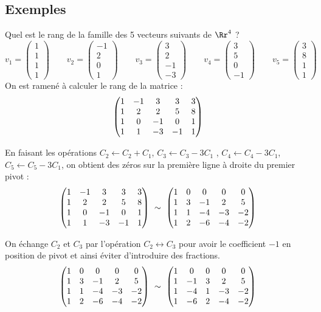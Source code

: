 \documentclass[class=report,crop=false]{standalone}
\begin{document}
\subsection{Exemples}

\begin{exemple}
Quel est le rang de la famille des 5 vecteurs suivants de $\Rr^4$ ?
$$
v_1=\begin{pmatrix}1 \\ 1 \\ 1 \\ 1\end{pmatrix} \qquad
v_2=\begin{pmatrix}-1 \\ 2 \\ 0 \\ 1\end{pmatrix} \qquad
v_3=\begin{pmatrix}3 \\ 2 \\ -1 \\ -3\end{pmatrix} \qquad
v_4=\begin{pmatrix}3 \\ 5 \\ 0 \\ -1\end{pmatrix} \qquad
v_5=\begin{pmatrix}3 \\ 8 \\ 1 \\ 1\end{pmatrix}$$
On est ramené à calculer le rang de la matrice :
$$\begin{pmatrix}
1&-1&3&3&3\cr
1&2&2&5&8\cr
1&0&-1&0&1\cr
1&1&-3&-1&1 \cr
\end{pmatrix}$$


En faisant les opérations $C_2 \leftarrow C_2+C_1$,
$C_3\leftarrow C_3-3C_1$ , $C_4\leftarrow
C_4-3C_1$,
$C_5\leftarrow C_5-3C_1$, on obtient des zéros
sur la première ligne à droite du premier pivot :
$$\begin{pmatrix}
1&-1&3&3&3\cr
1&2&2&5&8\cr
1&0&-1&0&1\cr
1&1&-3&-1&1 \cr
\end{pmatrix}
\ \sim\
\begin{pmatrix}
1&0&0&0&0\cr
1&3&-1&2&5\cr
1&1&-4&-3&-2\cr
1&2&-6&-4&-2 \cr
\end{pmatrix}$$

On échange $C_2$ et $C_3$ par l'opération $C_2 \leftrightarrow C_3$ pour avoir le coefficient $-1$ en position de pivot et ainsi
éviter d'introduire des fractions.
$$\begin{pmatrix}
1&0&0&0&0\cr
1&3&-1&2&5\cr
1&1&-4&-3&-2\cr
1&2&-6&-4&-2 \cr
\end{pmatrix}\ \sim\
\begin{pmatrix}
1&0&0&0&0\cr
1&-1&3&2&5\cr
1&-4&1&-3&-2\cr
1&-6&2&-4&-2 \cr
\end{pmatrix}$$


\end{exemple}
\end{document}
